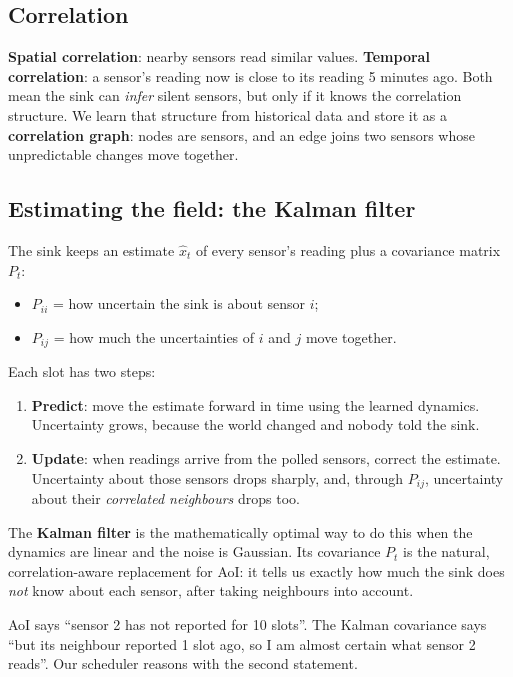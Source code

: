 \subsection{Correlation}

\textbf{Spatial correlation}: nearby sensors read similar values. \textbf{Temporal correlation}: a sensor's
reading now is close to its reading 5 minutes ago. Both mean the sink can \emph{infer} silent sensors, but only if
it knows the correlation structure. We learn that structure from historical data and store it as a
\textbf{correlation graph}: nodes are sensors, and an edge joins two sensors whose unpredictable changes move
together.

\subsection{Estimating the field: the Kalman filter}

The sink keeps an estimate $\hat x_t$ of every sensor's reading plus a covariance matrix $P_t$:
\begin{itemize}
  \item $P_{ii}$ = how uncertain the sink is about sensor $i$;
  \item $P_{ij}$ = how much the uncertainties of $i$ and $j$ move together.
\end{itemize}
Each slot has two steps:
\begin{enumerate}
  \item \textbf{Predict}: move the estimate forward in time using the learned dynamics. Uncertainty grows, because
        the world changed and nobody told the sink.
  \item \textbf{Update}: when readings arrive from the polled sensors, correct the estimate. Uncertainty about
        those sensors drops sharply, and, through $P_{ij}$, uncertainty about their \emph{correlated neighbours} drops
        too.
\end{enumerate}
The \textbf{Kalman filter} \cite{20} is the mathematically optimal way to do this when the dynamics are linear and the
noise is Gaussian. Its covariance $P_t$ is the natural, correlation-aware replacement for AoI: it tells us exactly
how much the sink does \emph{not} know about each sensor, after taking neighbours into account.

\begin{keybox}
AoI says ``sensor 2 has not reported for 10 slots''. The Kalman covariance says ``but its neighbour reported 1 slot
ago, so I am almost certain what sensor 2 reads''. Our scheduler reasons with the second statement.
\end{keybox}

